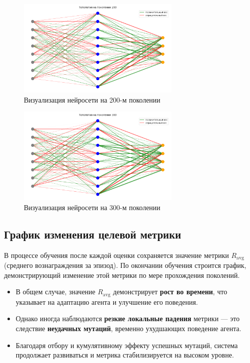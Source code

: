 \documentclass[a4paper,12pt]{article}
\begin{document}
\begin{figure}[H]
	\centering
	\includegraphics[width=0.7\textwidth]{images/topologies/topology_gen_200.png}
	\caption{Визуализация нейросети на 200-м поколении}
	\label{fig:struct_screenshot}
\end{figure}

\begin{figure}[H]
	\centering
	\includegraphics[width=0.7\textwidth]{images/topologies/topology_gen_300.png}
	\caption{Визуализация нейросети на 300-м поколении}
	\label{fig:struct_screenshot}
\end{figure}

\subsection{График изменения целевой метрики}

В процессе обучения после каждой оценки сохраняется значение метрики $R_{\text{avg}}$ (среднего вознаграждения за эпизод). По окончании обучения строится график, демонстрирующий изменение этой метрики по мере прохождения поколений.

\begin{itemize}
    \item В общем случае, значение $R_{\text{avg}}$ демонстрирует \textbf{рост во времени}, что указывает на адаптацию агента и улучшение его поведения.
    \item Однако иногда наблюдаются \textbf{резкие локальные падения} метрики — это следствие \textbf{неудачных мутаций}, временно ухудшающих поведение агента.
    \item Благодаря отбору и кумулятивному эффекту успешных мутаций, система продолжает развиваться и метрика стабилизируется на высоком уровне.
\end{itemize}
\end{document}
